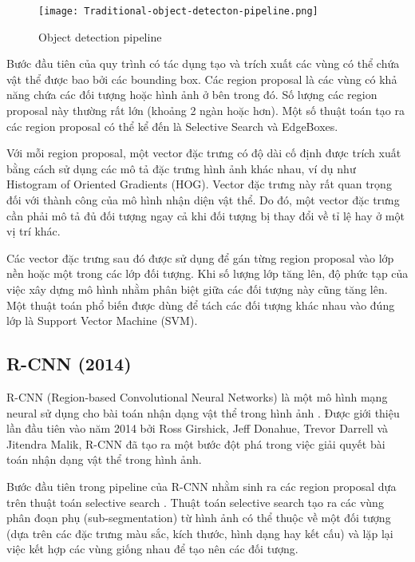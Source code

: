 \begin{figure}
	\centering
	\texttt{[image: Traditional-object-detecton-pipeline.png]}
	\caption{Object detection pipeline}
	\label{fig:OD-pipeline}
\end{figure}


Bước đầu tiên của quy trình có tác dụng tạo và trích xuất các vùng có thể chứa vật thể được bao bởi các bounding box. Các region proposal là các vùng có khả năng chứa các đối tượng hoặc hình ảnh ở bên trong đó. Số lượng các region proposal này thường rất lớn (khoảng 2 ngàn hoặc hơn). Một số thuật toán tạo ra các region proposal có thể kể đến là Selective Search và EdgeBoxes.


Với mỗi region proposal, một vector đặc trưng có độ dài cố định được trích xuất bằng cách sử dụng các mô tả đặc trưng hình ảnh khác nhau, ví dụ như Histogram of Oriented Gradients (HOG). Vector đặc trưng này rất quan trọng đối với thành công của mô hình nhận diện vật thể. Do đó, một vector đặc trưng cần phải mô tả đủ đối tượng ngay cả khi đối tượng bị thay đổi về tỉ lệ hay ở một vị trí khác.

Các vector đặc trưng sau đó được sử dụng để gán từng region proposal vào lớp nền hoặc một trong các lớp đối tượng. Khi số lượng lớp tăng lên, độ phức tạp của việc xây dựng mô hình nhằm phân biệt giữa các đối tượng này cũng tăng lên. Một thuật toán phổ biến được dùng để tách các đối tượng khác nhau vào đúng lớp là Support Vector Machine (SVM).


\subsection{R-CNN (2014)}
R-CNN (Region-based Convolutional Neural Networks) là một mô hình mạng neural sử dụng cho bài toán nhận dạng vật thể trong hình ảnh \cite{girshick2014rich}. Được giới thiệu lần đầu tiên vào năm 2014 bởi Ross Girshick, Jeff Donahue, Trevor Darrell và Jitendra Malik, R-CNN đã tạo ra một bước đột phá trong việc giải quyết bài toán nhận dạng vật thể trong hình ảnh.

Bước đầu tiên trong pipeline của R-CNN nhằm sinh ra các region proposal dựa trên thuật toán selective search \cite{uijlings2013selective}. Thuật toán selective search tạo ra các vùng phân đoạn phụ (sub-segmentation) từ hình ảnh có thể thuộc về một đối tượng (dựa trên các đặc trưng màu sắc, kích thước, hình dạng hay kết cấu) và lặp lại việc kết hợp các vùng giống nhau để tạo nên các đối tượng.

